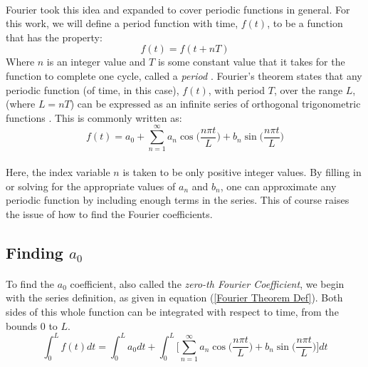 \documentclass[12pt,letterpaper]{article}
\begin{document}
\paragraph*{}Fourier took this idea and expanded to cover periodic functions in general. For this work, we will define a period function with time, $f(t)$, to be a function that has the property:
\begin{equation}
\label{period def}
f(t) = f(t + nT)
\end{equation} 
Where $n$ is an integer value and $T$ is some constant value that it takes for the function to complete one cycle, called a \textit{period} \cite{Tolstov}.
Fourier's theorem states that any periodic function (of time, in this case), $f(t)$, with period $T$, over the range $L$, (where $L = nT$) can be expressed as an infinite series of orthogonal trigonometric functions \cite{Taylor}. This is commonly written as:
\begin{equation}
\label{Fourier Theorem Def}
f(t) = a_0 + \sum_{n=1}^{\infty} a_n \cos\Big(\frac{n\pi t}{L}\Big) + b_n \sin\Big(\frac{n\pi t}{L}\Big)
\end{equation} 
\paragraph*{}Here, the index variable $n$ is taken to be only positive integer values. By filling in or solving for the appropriate values of $a_n$ and $b_n$, one can approximate any periodic function by including enough terms in the series. This of course raises the issue of how to find the Fourier coefficients.


\subsection{Finding $a_0$}
\paragraph*{}To find the $a_0$ coefficient, also called the \textit{zero-th Fourier Coefficient}, we begin with the series definition, as given in equation (\ref{Fourier Theorem Def}). Both sides of this whole function can be integrated with respect to time, from the bounds $0$ to $L$.
\begin{equation}
\label{step1}
\int_0^L f(t) dt = \int_0^L a_0 dt + 
\int_0^L \Bigg[ \sum_{n=1}^{\infty} a_n \cos\Big(\frac{n\pi t}{L}\Big) + 
b_n \sin\Big(\frac{n\pi t}{L}\Big) \Bigg] dt
\end{equation} 
\end{document}
